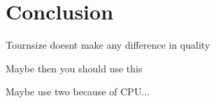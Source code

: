 \section{Conclusion}
\label{sec:conclusion}

Tournsize doesnt make any difference in quality

Maybe then you should use this

Maybe use two because of CPU...